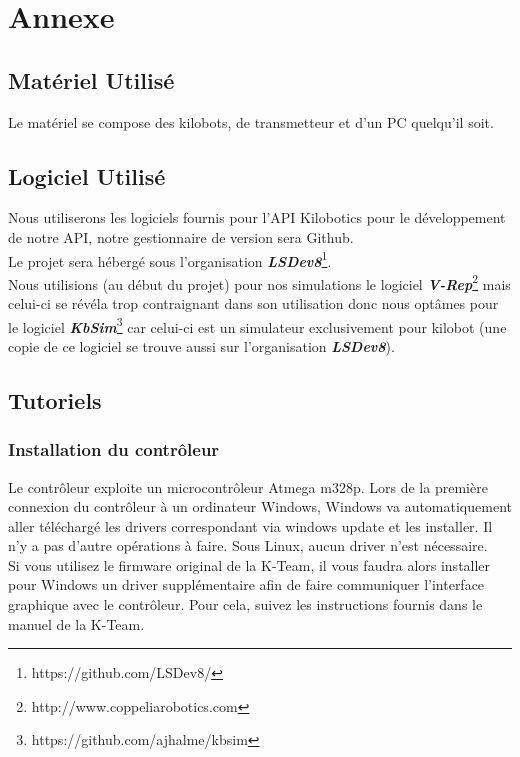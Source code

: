\documentclass[a4paper,8pt]{report}
\begin{document}
\chapter{Annexe}

\section*{Mat\'eriel Utilis\'e}\label{sec:name}

Le mat\'eriel se compose des kilobots, de transmetteur et d'un PC quelqu'il soit.

\section*{Logiciel Utilis\'e}\label{sec:name}

Nous utiliserons les logiciels fournis pour l'API Kilobotics pour le d\'eveloppement de notre API, notre gestionnaire de version sera Github.\\
Le projet sera h\'eberg\'e sous l'organisation \textit{\textbf{LSDev8}}\footnote{https://github.com/LSDev8/}.\\
Nous utilisions (au d\'ebut du projet) pour nos simulations le logiciel \textit{\textbf{V-Rep}}\footnote{http://www.coppeliarobotics.com} mais celui-ci se r\'ev\'ela trop contraignant dans son utilisation donc nous opt\^ames pour le logiciel \textit{\textbf{KbSim}}\footnote{https://github.com/ajhalme/kbsim} car celui-ci est un simulateur exclusivement pour kilobot (une copie de ce logiciel se trouve aussi sur l'organisation \textit{\textbf{LSDev8}}).\\


\section*{Tutoriels}\label{sec:name}

\subsection*{Installation du contr\^oleur}\label{sec:name}

Le contr\^oleur exploite un microcontr\^oleur Atmega m328p. Lors de la première connexion du contr\^oleur \`a un ordinateur Windows, Windows va automatiquement aller t\'el\'echarg\'e les drivers correspondant via windows update et les installer. Il n'y a pas d'autre op\'erations \`a faire. Sous Linux, aucun driver n'est n\'ecessaire.\\
Si vous utilisez le firmware original de la K-Team, il vous faudra alors installer pour Windows un driver suppl\'ementaire afin de faire communiquer l'interface graphique avec le contr\^oleur. Pour cela, suivez les instructions fournis dans le manuel de la K-Team.
\end{document}
